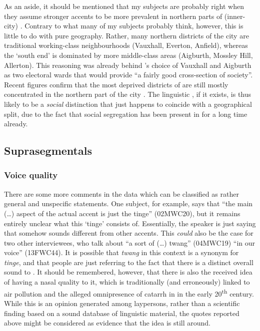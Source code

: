 As an aside, it should be mentioned that my subjects are probably right when they assume stronger accents to be more prevalent in northern parts of (inner-city) .
Contrary to what many of my subjects probably think, however, this is little to do with pure geography.
Rather, many northern districts of the city are traditional working-class neighbourhoods (Vauxhall, Everton, Anfield), whereas the `south end' is dominated by more middle-class areas (Aigburth, Mossley Hill, Allerton).
This reasoning was already behind \citeauthor{knowles1973}'s choice of Vauxhall and Aigburth as two electoral wards that would provide ``a fairly good cross-section of  society''\parencite[2]{knowles1973}.
Recent figures confirm that the most deprived districts of  are still mostly concentrated in the northern part of the city \parencite[cf.][iii]{lcc2010}.
The linguistic , if it exists, is thus likely to be a \emph{social} distinction that just happens to coincide with a geographical split, due to the fact that social segregation has been present in  for a long time already.

\subsection{Suprasegmentals}
\label{sec.qual.supra}

\subsubsection{Voice quality}

There are some more comments in the data which can be classified as rather general and unspecific statements.
One subject, for example, says that ``the main (\ldots) aspect of the actual accent is just the tinge'' (02MWC20), but it remains entirely unclear what this `tinge' consists of.
Essentially, the speaker is just saying that  somehow sounds different from other accents.
This \emph{could} also be the case for two other interviewees, who talk about ``a sort of (\ldots) twang'' (04MWC19) ``in our voice'' (13FWC44).
It is possible that \emph{twang} in this context is a synonym for \emph{tinge}, and that people are just referring to the fact that there is a distinct overall sound to .
It should be remembered, however, that there is also the received idea of  having a nasal quality to it, which is traditionally (and erroneously) linked to air pollution and the alleged omnipresence of catarrh in  in the early 20\textsuperscript{th} century.
While this is an opinion generated among laypersons, rather than a scientific finding based on a sound database of linguistic material, the quotes reported above might be considered as evidence that the idea is still around.

